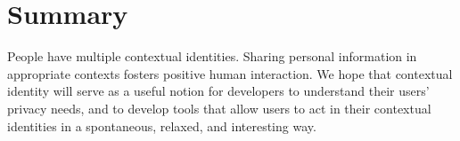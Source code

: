 \documentclass[10pt, conference, compsocconf]{IEEEtran}
\begin{document}
\section{Summary}
People have multiple contextual identities. Sharing personal information in
appropriate contexts fosters positive human interaction.  We hope that
contextual identity will serve as a useful notion for developers to understand
their users' privacy needs, and to develop tools that allow users to act in
their contextual identities in a spontaneous, relaxed, and interesting way.

\begin{comment}
\section{Acknowledgements}
The authors thank
Lucas Adamski
Ben Adida
Mike Connor
Chris Karlof
\end{comment}



\end{document}
